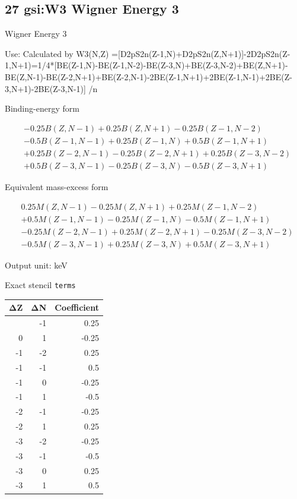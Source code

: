 \documentclass[
  11pt,
  letterpaper,
]{article}
\begin{document}
\subsection{27 gsi:W3 Wigner Energy 3}\label{gsiw3-wigner-energy-3}

Wigner Energy 3

Use: Calculated by W3(N,Z)
={[}D2pS2n(Z-1,N)+D2pS2n(Z,N+1){]}-2D2pS2n(Z-1,N+1)=1/4*{[}BE(Z-1,N)-BE(Z-1,N-2)-BE(Z-3,N)+BE(Z-3,N-2)+BE(Z,N+1)-BE(Z,N-1)-BE(Z-2,N+1)+BE(Z-2,N-1)-2BE(Z-1,N+1)+2BE(Z-1,N-1)+2BE(Z-3,N+1)-2BE(Z-3,N-1){]}
/n

Binding-energy form

\[
\begin{aligned}
& -0.25B(Z,N-1)+0.25B(Z,N+1)-0.25B(Z-1,N-2) \\
& -0.5B(Z-1,N-1)+0.25B(Z-1,N)+0.5B(Z-1,N+1) \\
& +0.25B(Z-2,N-1)-0.25B(Z-2,N+1)+0.25B(Z-3,N-2) \\
& +0.5B(Z-3,N-1)-0.25B(Z-3,N)-0.5B(Z-3,N+1)
\end{aligned}
\]

Equivalent mass-excess form

\[
\begin{aligned}
& 0.25M(Z,N-1)-0.25M(Z,N+1)+0.25M(Z-1,N-2) \\
& +0.5M(Z-1,N-1)-0.25M(Z-1,N)-0.5M(Z-1,N+1) \\
& -0.25M(Z-2,N-1)+0.25M(Z-2,N+1)-0.25M(Z-3,N-2) \\
& -0.5M(Z-3,N-1)+0.25M(Z-3,N)+0.5M(Z-3,N+1)
\end{aligned}
\]

Output unit: keV

Exact stencil \texttt{terms}

\begin{longtable}[]{@{}rrr@{}}
\toprule\noalign{}
ΔZ & ΔN & Coefficient \\
\midrule\noalign{}
\endhead
\bottomrule\noalign{}
\endlastfoot
0 & -1 & 0.25 \\
0 & 1 & -0.25 \\
-1 & -2 & 0.25 \\
-1 & -1 & 0.5 \\
-1 & 0 & -0.25 \\
-1 & 1 & -0.5 \\
-2 & -1 & -0.25 \\
-2 & 1 & 0.25 \\
-3 & -2 & -0.25 \\
-3 & -1 & -0.5 \\
-3 & 0 & 0.25 \\
-3 & 1 & 0.5 \\
\end{longtable}
\end{document}

